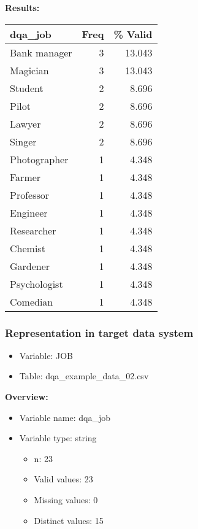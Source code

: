 \documentclass[
]{article}
\providecommand{\tightlist}{%
  \setlength{\itemsep}{0pt}\setlength{\parskip}{0pt}}
\begin{document}
\textbf{Results:}\\

\begin{table}[H]
\centering
\begin{tabular}{l|r|r}
\hline
\textbf{dqa\_job} & \textbf{Freq} & \textbf{\% Valid}\\
\hline
Bank manager & 3 & 13.043\\
\hline
Magician & 3 & 13.043\\
\hline
Student & 2 & 8.696\\
\hline
Pilot & 2 & 8.696\\
\hline
Lawyer & 2 & 8.696\\
\hline
Singer & 2 & 8.696\\
\hline
Photographer & 1 & 4.348\\
\hline
Farmer & 1 & 4.348\\
\hline
Professor & 1 & 4.348\\
\hline
Engineer & 1 & 4.348\\
\hline
Researcher & 1 & 4.348\\
\hline
Chemist & 1 & 4.348\\
\hline
Gardener & 1 & 4.348\\
\hline
Psychologist & 1 & 4.348\\
\hline
Comedian & 1 & 4.348\\
\hline
\end{tabular}
\end{table}
\newpage

\hypertarget{representation-in-target-data-system-8}{%
\subsubsection{\texorpdfstring{Representation in \textbf{target} data
system}{Representation in target data system}}\label{representation-in-target-data-system-8}}

\begin{itemize}
\tightlist
\item
  Variable: JOB
\item
  Table: dqa\_example\_data\_02.csv
\end{itemize}

\textbf{Overview:}

\begin{itemize}
\tightlist
\item
  Variable name: dqa\_job
\item
  Variable type: string

  \begin{itemize}
  \tightlist
  \item
    n: 23
  \item
    Valid values: 23
  \item
    Missing values: 0
  \item
    Distinct values: 15
  \end{itemize}
\end{itemize}
\end{document}
